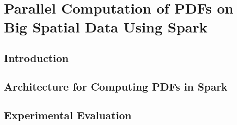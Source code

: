 \chapter{Parallel Computation of PDFs on Big Spatial Data Using Spark}\label{cap:ji}

\section{Introduction}

\section{Architecture for Computing PDFs in Spark}

\section{Experimental Evaluation}
